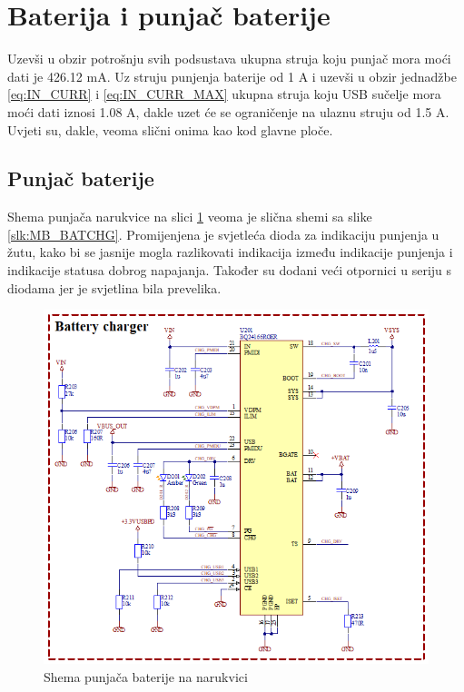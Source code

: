 \section{Baterija i punjač baterije}
\label{sec:BR_BATCHG}
Uzevši u obzir potrošnju svih podsustava ukupna struja koju punjač mora moći dati je 426.12 mA. Uz struju punjenja baterije od 1 A i uzevši u obzir jednadžbe \ref{eq:IN_CURR} i \ref{eq:IN_CURR_MAX} ukupna struja koju USB sučelje mora moći dati iznosi 1.08 A, dakle uzet će se ograničenje na ulaznu struju od 1.5 A. Uvjeti su, dakle, veoma slični onima kao kod glavne ploče.

\subsection{Punjač baterije}
Shema punjača narukvice na slici \ref{slk:BR_BATCHG} veoma je slična shemi sa slike \ref{slk:MB_BATCHG}. Promijenjena je svjetleća dioda za indikaciju punjenja u žutu, kako bi se jasnije mogla razlikovati indikacija između indikacije punjenja i indikacije statusa dobrog napajanja. Također su dodani veći otpornici u seriju s diodama jer je svjetlina bila prevelika.
\begin{figure}[H]
    \centering
    \includegraphics[width=\textwidth]{Figures/BR_BATCHG.png}
    \caption{Shema punjača baterije na narukvici}
    \label{slk:BR_BATCHG}
\end{figure}

